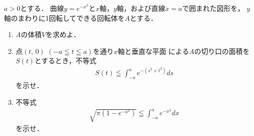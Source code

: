 \documentclass[../../main.tex]{subfiles}
\begin{document}
$a>0$とする．
曲線$y=e^{-x^2}$と$x$軸，$y$軸，および直線$x=a$で囲まれた図形を，
$y$軸のまわりに1回転してできる回転体を$A$とする．
\begin{enumerate}
  \item $A$の体積$V$を求めよ．
  \item 点$(t, \, 0)$ $(-a \leqq t \leqq a)$を通り$x$軸と垂直な平面
    による$A$の切り口の面積を$S(t)$とするとき，不等式
    \begin{align*}
      S(t)\leqq\int_{-a}^a e^{-(s^2+t^2)} ds
    \end{align*}
    を示せ．
  \item 不等式
    \begin{align*}
      \sqrt{\pi(1-e^{-a^2})}\leqq\int_{-a}^a e^{-x^2} dx
    \end{align*}
    を示せ．
\end{enumerate}
\end{document}
